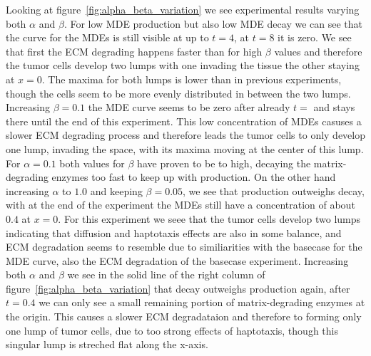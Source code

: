 Looking at figure~\ref{fig:alpha_beta_variation} we see experimental results varying both $\alpha$ and $\beta$. For low MDE production but also low MDE decay we can see that the curve for the MDEs is still visible at up to $t=4$, at $t=8$ it is zero. We see that first the ECM degrading happens faster than for high $\beta$ values and therefore the tumor cells develop two lumps with one invading the tissue the other staying at $x=0$. The maxima for both lumps is lower than in previous experiments, though the cells seem to be more evenly distributed in between the two lumps. Increasing $\beta=0.1$ the MDE curve seems to be zero after already $t=$ and stays there until the end of this experiment. This low concentration of MDEs casuses a slower ECM degrading process and therefore leads the tumor cells to only develop one lump, invading the space, with its maxima moving at the center of this lump. For $\alpha=0.1$ both values for $\beta$ have proven to be to high, decaying the matrix-degrading enzymes too fast to keep up with production.
On the other hand increasing $\alpha$ to $1.0$ and keeping $\beta=0.05$, we see that production outweighs decay, with at the end of the experiment the MDEs still have a concentration of about $0.4$ at $x=0$. For this experiment we seee that the tumor cells develop two lumps indicating that diffusion and haptotaxis effects are also in some balance, and ECM degradation seems to resemble due to similiarities with the basecase for the MDE curve, also the ECM degradation of the basecase experiment.
Increasing both $\alpha$ and $\beta$ we see in the solid line of the right column of figure~\ref{fig:alpha_beta_variation} that decay outweighs production again, after $t=0.4$ we can only see a small remaining portion of matrix-degrading enzymes at the origin. This causes a slower ECM degradataion and therefore to forming only one lump of tumor cells, due to too strong effects of haptotaxis, though this singular lump is streched flat along the x-axis.

